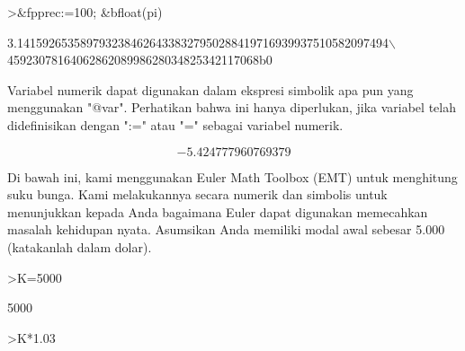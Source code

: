 \documentclass[a4paper,10pt]{article}
\begin{document}
\begin{eulernotebook}
\begin{eulercomment}
\begin{eulercomment}
\begin{eulercomment}
\begin{eulercomment}
\begin{eulercomment}
\begin{eulercomment}
\begin{eulercomment}
\begin{eulercomment}
\begin{eulercomment}
\begin{eulercomment}
\begin{eulercomment}
\begin{eulercomment}
\begin{eulercomment}
\begin{eulercomment}
\begin{eulercomment}
\begin{eulercomment}
\begin{eulercomment}
\begin{eulercomment}
\begin{eulercomment}
\begin{eulercomment}
\begin{eulercomment}
\begin{eulercomment}
\begin{eulercomment}
\begin{eulercomment}
\begin{eulercomment}
\begin{eulercomment}
\begin{eulercomment}
\begin{eulercomment}
\begin{eulercomment}
\begin{eulercomment}
\begin{eulerprompt}
>&fpprec:=100; &bfloat(pi)
\end{eulerprompt}
\begin{euleroutput}
  
          3.14159265358979323846264338327950288419716939937510582097494\(\backslash\)
  4592307816406286208998628034825342117068b0
  
\end{euleroutput}
\begin{eulercomment}
Variabel numerik dapat digunakan dalam ekspresi simbolik apa pun yang
menggunakan "@var". Perhatikan bahwa ini hanya diperlukan, jika
variabel telah didefinisikan dengan ":=" atau "=" sebagai variabel
numerik.
\end{eulercomment}
\begin{eulerformula}
\[
-5.424777960769379
\]
\end{eulerformula}
\begin{eulercomment}
\begin{eulercomment}
\begin{eulercomment}
Di bawah ini, kami menggunakan Euler Math Toolbox (EMT) untuk
menghitung suku bunga. Kami melakukannya secara numerik dan simbolis
untuk menunjukkan kepada Anda bagaimana Euler dapat digunakan
memecahkan masalah kehidupan nyata. Asumsikan Anda memiliki modal awal
sebesar 5.000 (katakanlah dalam dolar).
\end{eulercomment}
\begin{eulerprompt}
>K=5000
\end{eulerprompt}
\begin{euleroutput}
  5000
\end{euleroutput}
\begin{eulerprompt}
>K*1.03
\end{eulerprompt}

\end{eulercomment}
\end{eulercomment}
\end{eulercomment}
\end{eulercomment}
\end{eulercomment}
\end{eulercomment}
\end{eulercomment}
\end{eulercomment}
\end{eulercomment}
\end{eulercomment}
\end{eulercomment}
\end{eulercomment}
\end{eulercomment}
\end{eulercomment}
\end{eulercomment}
\end{eulercomment}
\end{eulercomment}
\end{eulercomment}
\end{eulercomment}
\end{eulercomment}
\end{eulercomment}
\end{eulercomment}
\end{eulercomment}
\end{eulercomment}
\end{eulercomment}
\end{eulercomment}
\end{eulercomment}
\end{eulercomment}
\end{eulercomment}
\end{eulercomment}
\end{eulercomment}
\end{eulercomment}
\end{eulernotebook}
\end{document}
